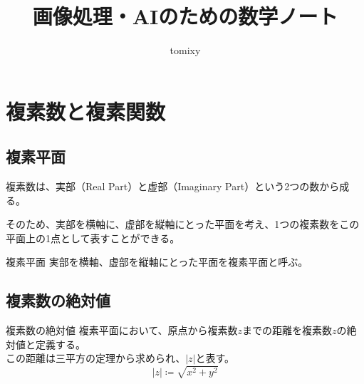 \documentclass[16pt,b5paper]{book}
\title{画像処理・AIのための数学ノート}
\author{tomixy}
\begin{document}
\maketitle
\tableofcontents

\chapter{複素数と複素関数}

\section{複素平面}

複素数は、実部（Real Part）と虚部（Imaginary Part）という2つの数から成る。

そのため、実部を横軸に、虚部を縦軸にとった平面を考え、1つの複素数をこの平面上の1点として表すことができる。

\begin{definition}{複素平面}
  実部を横軸、虚部を縦軸にとった平面を複素平面と呼ぶ。
\end{definition}

\begin{center}
\end{center}

\section{複素数の絶対値}

\begin{definition}{複素数の絶対値}
  \newline
  複素平面において、原点から複素数$z$までの距離を複素数$z$の絶対値と定義する。\\
  この距離は三平方の定理から求められ、$|z|$と表す。
  \LARGE
  \begin{equation}
    |z| \coloneqq \sqrt{x^2 + y^2}
  \end{equation}
\end{definition}
\end{document}
